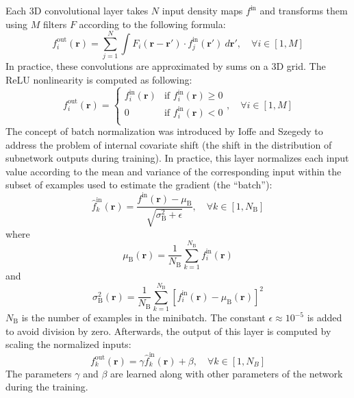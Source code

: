 \documentclass{bioinfo}
\begin{document}
Each 3D convolutional layer takes $N$ input density maps $f^\text{in}$
and transforms them using $M$ filters $F$ according to the following
formula:
\begin{equation}
f^\text{out}_i (\mathbf{r}) = \sum^{N}_{j=1} \int F_i (\mathbf{r} - \mathbf{r'}) \cdot f^\text{in}_j(\mathbf{r'}) ~d\mathbf{r'}, \quad\forall i \in [1,M]
\end{equation}
In practice, these convolutions are approximated by sums on a 3D grid.
The ReLU nonlinearity is computed as following:
\begin{equation}
f^\text{out}_i (\mathbf{r}) = \begin{cases}
               f^\text{in}_i(\mathbf{r}) &\text{if } f^\text{in}_i(\mathbf{r})\geq 0\\
               0                         &\text{if } f^\text{in}_i(\mathbf{r})<0\\
            \end{cases}, \quad\forall i \in [1,M]
\end{equation}
The concept of batch normalization was introduced by Ioffe and
Szegedy \citep{ioffe2015batch} to address the problem of internal
covariate shift (the shift in the distribution of subnetwork outputs
during training). In practice, this layer normalizes each input value
according to the mean and variance of the corresponding input within
the subset of examples used to estimate the gradient (the ``batch''):
\begin{equation}
\hat{f}^\text{in}_k(\mathbf{r}) = \frac{f^\text{in}(\mathbf{r}) - \mu_\text{B}}{\sqrt{\sigma^{2}_\text{B} + \epsilon}}, \quad\forall k \in [1,N_\text{B}]
\end{equation}
where
\begin{equation}
\mu_\text{B}(\mathbf{r})
= \frac{1}{N_\text{B}} \sum_{k=1}^{N_\text{B}}
f^\text{in}_i(\mathbf{r})
\end{equation}
and
\begin{equation}
\sigma^{2}_\text{B}(\mathbf{r})
= \frac{1}{N_\text{B}} \sum_{k=1}^{N_\text{B}} \left[
f^\text{in}_i(\mathbf{r}) - \mu_\text{B}
(\mathbf{r}) \right]^2
\end{equation}
$N_\text{B}$ is the number of examples in the
minibatch. The constant $\epsilon \approx 10^{-5}$ is added to avoid division by
zero. Afterwards, the output of this layer is computed by scaling the
normalized inputs:
\begin{equation}
f^\text{out}_k(\mathbf{r}) = \gamma \hat{f}^\text{in}_k(\mathbf{r}) + \beta, \quad\forall k \in [1,N_B]
\end{equation}
The parameters $\gamma$ and $\beta$ are learned along with other
parameters of the network during the training.
\end{document}
